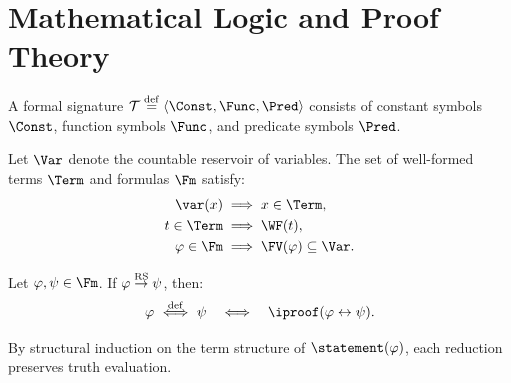 \section{Mathematical Logic and Proof Theory}

\begin{definition}
A formal signature $\Tau \eqdef \tuple{\Const, \Func, \Pred}$ consists of constant symbols $\Const$, function symbols $\Func$, and predicate symbols $\Pred$.
\end{definition}

\begin{definition}
Let $\Var$ denote the countable reservoir of variables. The set of well-formed terms $\Term$ and formulas $\Fm$ satisfy:
\begin{align*}
\var(x) &\implies x \in \Term, \\
t \in \Term &\implies \WF(t), \\
\varphi \in \Fm &\implies \FV(\varphi) \subseteq \Var.
\end{align*}
\end{definition}

\begin{theorem}
Let $\varphi, \psi \in \Fm$. If $\varphi \stackrel{\mathrm{RS}}{\to} \psi$, then:
\[
\varphi \propdef \psi \quad \LRA \quad \iproof(\varphi \leftrightarrow \psi).
\]
\end{theorem}

\myprf
By structural induction on the term structure of $\statement(\varphi)$, each reduction preserves truth evaluation.
\myqed

